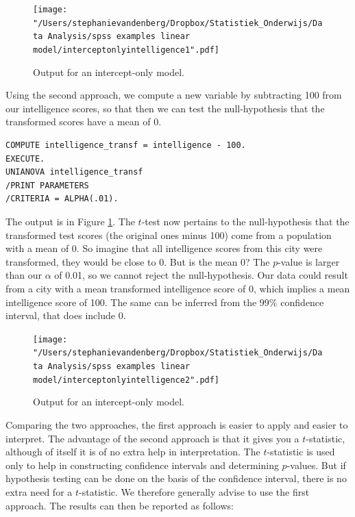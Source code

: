 \documentclass[]{book}\usepackage[]{graphicx}\usepackage[]{color}
\begin{document}
 
\begin{figure}[h!]
    \begin{center}
       \texttt{[image: "/Users/stephanievandenberg/Dropbox/Statistiek\_Onderwijs/Data Analysis/spss examples linear model/interceptonlyintelligence1".pdf]}
    \end{center}
    \caption{Output for an intercept-only model.}
    \label{fig:int_only_spss_intelligence1}
\end{figure}



Using the second approach, we compute a new variable by subtracting 100 from our intelligence scores, so that then we can test the null-hypothesis that the transformed scores have a mean of 0. 

\begin{verbatim}
COMPUTE intelligence_transf = intelligence - 100.
EXECUTE.
UNIANOVA intelligence_transf
/PRINT PARAMETERS
/CRITERIA = ALPHA(.01).
\end{verbatim}


The output is in Figure \ref{fig:int_only_spss_intelligence1}. The $t$-test now pertains to the null-hypothesis that the transformed test scores (the original ones minus 100) come from a population with a mean of 0. So imagine that all intelligence scores from this city were transformed, they would be close to 0. But is the mean 0? The $p$-value is larger than our $\alpha$ of 0.01, so we cannot reject the null-hypothesis. Our data could result from a city with a mean transformed intelligence score of 0, which implies a mean intelligence score of 100. The same can be inferred from the 99\% confidence interval, that does include 0. 

\begin{figure}[h!]
    \begin{center}
       \texttt{[image: "/Users/stephanievandenberg/Dropbox/Statistiek\_Onderwijs/Data Analysis/spss examples linear model/interceptonlyintelligence2".pdf]}
    \end{center}
    \caption{Output for an intercept-only model.}
    \label{fig:int_only_spss_intelligence2}
\end{figure}


Comparing the two approaches, the first approach is easier to apply and easier to interpret. The advantage of the second approach is that it gives you a $t$-statistic, although of itself it is of no extra help in interpretation. The $t$-statistic is used only to help in constructing confidence intervals and determining $p$-values. But if hypothesis testing can be done on the basis of the confidence interval, there is no extra need for a $t$-statistic. We therefore generally advise to use the first approach. The results can then be reported as follows:
\end{document}
